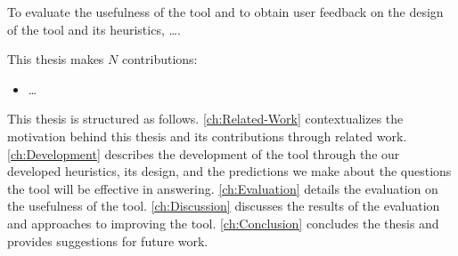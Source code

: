 To evaluate the usefulness of the tool and to obtain user feedback on the design of the tool and its heuristics, \dots {}.

This thesis makes $N$ contributions:
\begin{itemize}
	\item \dots {}
\end{itemize}

This thesis is structured as follows. 
\autoref{ch:Related-Work} contextualizes the motivation behind this thesis and its contributions through related work. 
\autoref{ch:Development} describes the development of the tool through the our developed heuristics, its design, and the predictions we make about the questions the tool will be effective in answering. 
\autoref{ch:Evaluation} details the evaluation on the usefulness of the tool.
\autoref{ch:Discussion} discusses the results of the evaluation and approaches to improving the tool.
\autoref{ch:Conclusion} concludes the thesis and provides suggestions for future work.

\endinput

Any text after an \endinput is ignored.
You could put scraps here or things in progress.
